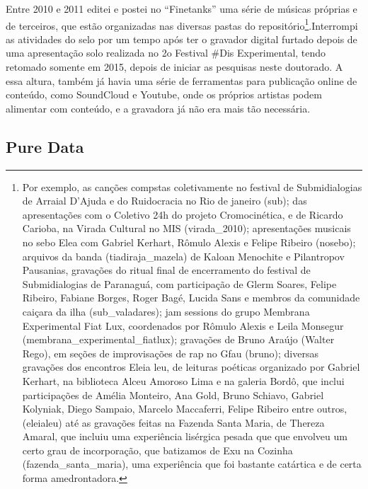 	Entre 2010 e 2011 editei e postei no ``Finetanks'' uma série de músicas próprias e de terceiros, que estão organizadas nas diversas pastas do repositório\footnote{ Por exemplo, as canções compstas coletivamente no festival de Submidialogias de Arraial D'Ajuda e do Ruidocracia no Rio de janeiro (\/sub\/); das apresentações com o Coletivo 24h do projeto Cromocinética, e de Ricardo Carioba, na Virada Cultural no MIS (virada\_2010\/); apresentações musicais no sebo Elea com Gabriel Kerhart, Rômulo Alexis e Felipe Ribeiro (nosebo\/); arquivos da banda (tiadiraja\_mazela\/) de Kaloan Menochite e Pilantropov Pausanias, gravações do ritual final de encerramento do festival de Submidialogias de Paranaguá, com participação de Glerm Soares, Felipe Ribeiro, Fabiane Borges, Roger Bagé, Lucida Sans e membros da comunidade caiçara da ilha (\/sub\_valadares\/); jam sessions do grupo Membrana Experimental Fiat Lux, coordenados por Rômulo Alexis e Leila Monsegur (membrana\_experimental\_fiatlux\/); gravações de Bruno Araújo (Walter Rego), em seções de improvisações de rap no Gfau (bruno\/); diversas gravações dos encontros Eleia leu,  de leituras poéticas organizado por Gabriel Kerhart, na biblioteca Alceu Amoroso Lima e na galeria Bordô, que inclui participações de Amélia Monteiro, Ana Gold, Bruno Schiavo, Gabriel Kolyniak, Diego Sampaio, Marcelo Maccaferri, Felipe Ribeiro entre outros, (\/eleialeu\/) até as gravações feitas na Fazenda Santa Maria, de Thereza Amaral, que incluiu uma experiência lisérgica pesada que que envolveu um certo grau de incorporação, que batizamos de Exu na Cozinha (\/fazenda\_santa\_maria\/), uma experiência que foi bastante catártica e de certa forma amedrontadora. }.Interrompi as atividades do selo por um tempo após ter o gravador digital furtado depois de uma apresentação solo realizada no 2o Festival \#Dis Experimental, tendo retomado somente em 2015, depois de iniciar as pesquisas neste doutorado. A essa altura, também já havia uma série de ferramentas para publicação online de conteúdo, como SoundCloud e Youtube, onde os próprios artistas podem alimentar com conteúdo, e a gravadora já não era mais tão necessária.





\subsection{Pure Data}

